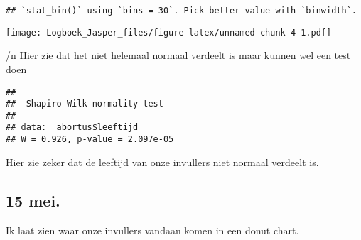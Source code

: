 \documentclass[
]{article}
\newenvironment{Shaded}{\begin{snugshade}}{\end{snugshade}}
\newcommand{\FunctionTok}[1]{\textcolor[rgb]{0.13,0.29,0.53}{\textbf{#1}}}
\newcommand{\NormalTok}[1]{#1}
\newcommand{\SpecialCharTok}[1]{\textcolor[rgb]{0.81,0.36,0.00}{\textbf{#1}}}
\begin{document}
\begin{verbatim}
## `stat_bin()` using `bins = 30`. Pick better value with `binwidth`.
\end{verbatim}

\texttt{[image: Logboek\_Jasper\_files/figure-latex/unnamed-chunk-4-1.pdf]}

/n Hier zie dat het niet helemaal normaal verdeelt is maar kunnen wel
een test doen

\begin{Shaded}
\end{Shaded}

\begin{verbatim}
## 
##  Shapiro-Wilk normality test
## 
## data:  abortus$leeftijd
## W = 0.926, p-value = 2.097e-05
\end{verbatim}

Hier zie zeker dat de leeftijd van onze invullers niet normaal verdeelt
is.

\subsection{15 mei.}\label{mei.}

Ik laat zien waar onze invullers vandaan komen in een donut chart.
\end{document}

